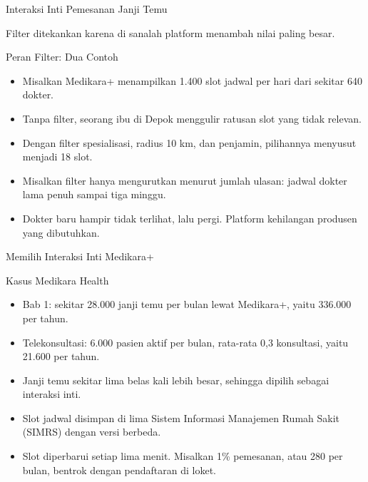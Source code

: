 \documentclass[aspectratio=169, table, 12pt]{beamer}
\begin{document}
\begin{frame}{{\Large Interaksi Inti Pemesanan Janji Temu}}
  \centering
  \resizebox{0.86\textwidth}{!}{}

  \vspace{4pt}
  {\footnotesize Filter ditekankan karena di sanalah platform menambah nilai paling besar.\par}
\end{frame}

\begin{frame}{{\Large Peran Filter: Dua Contoh}}
  \vspace{6pt}
  \begin{itemize}
    \item Misalkan Medikara+ menampilkan 1.400 slot jadwal per hari dari sekitar 640 dokter.
    \item Tanpa filter, seorang ibu di Depok menggulir ratusan slot yang tidak relevan.
    \item Dengan filter spesialisasi, radius 10 km, dan penjamin, pilihannya menyusut menjadi 18 slot.
    \item Misalkan filter hanya mengurutkan menurut jumlah ulasan: jadwal dokter lama penuh sampai tiga minggu.
    \item Dokter baru hampir tidak terlihat, lalu pergi. Platform kehilangan produsen yang dibutuhkan.
  \end{itemize}
\end{frame}

\begin{frame}{{\Large Memilih Interaksi Inti Medikara+}}
  \begin{block}{Kasus Medikara Health}
    \small
    \begin{itemize}
      \item Bab 1: sekitar 28.000 janji temu per bulan lewat Medikara+, yaitu 336.000 per tahun.
      \item Telekonsultasi: 6.000 pasien aktif per bulan, rata-rata 0,3 konsultasi, yaitu 21.600 per tahun.
      \item Janji temu sekitar lima belas kali lebih besar, sehingga dipilih sebagai interaksi inti.
      \item Slot jadwal disimpan di lima Sistem Informasi Manajemen Rumah Sakit (SIMRS) dengan versi berbeda.
      \item Slot diperbarui setiap lima menit. Misalkan 1\% pemesanan, atau 280 per bulan, bentrok dengan pendaftaran di loket.
    \end{itemize}
  \end{block}
\end{frame}
\end{document}
